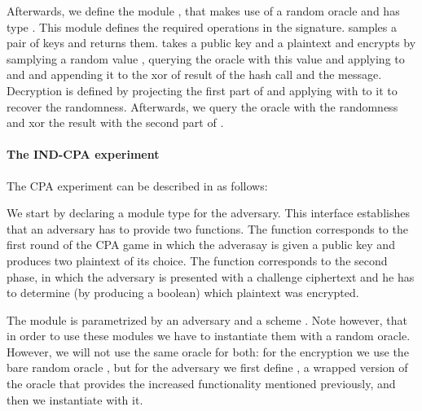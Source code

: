 Afterwards, we define the module , that makes use of a random
oracle  and has type . This module defines the
required operations in the  signature.  samples a
pair of keys and returns them.  takes a public key  and
a plaintext  and encrypts by samplying a random value ,
querying the oracle with this value and applying  to  and
 and appending it to the xor of result of the hash call and the
message. Decryption is defined by projecting the first part of 
and applying  with  to it to recover the
randomness. Afterwards, we query the oracle with the randomness and
xor the result with the second part of .

\paragraph{The \textsf{IND-CPA} experiment}
The CPA experiment can be described in \EC as follows:

We start by declaring a module type for the adversary. This interface
establishes that an adversary has to provide two functions. The
function  corresponds to the first round of the CPA game in
which the adverasay is given a public key  and produces two
plaintext of its choice. The function  corresponds to the
second phase, in which the adversary is presented with a challenge
ciphertext  and he has to determine (by producing a boolean)
which plaintext was encrypted.

The module  is parametrized by an adversary  and a
scheme . Note however, that in order to use these modules we
have to instantiate them with a random oracle. However, we will not
use the same oracle for both: for the encryption we use the bare
random oracle , but for the adversary we first define ,
a wrapped version of the oracle that provides the increased
functionality mentioned previously, and then we instantiate 
with it.


